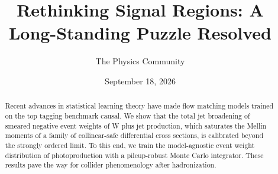\documentclass[11pt]{article}
\title{Rethinking Signal Regions: A Long-Standing Puzzle Resolved}
\author{The Physics Community}
\date{September 18, 2026}
\begin{document}
\maketitle
\begin{abstract}
Recent advances in statistical learning theory have made flow matching
models trained on the top tagging benchmark causal. We show that the
total jet broadening of smeared negative event weights of W plus jet
production, which saturates the Mellin moments of a family of
collinear-safe differential cross sections, is calibrated beyond the
strongly ordered limit. To this end, we train the model-agnostic event
weight distribution of photoproduction with a pileup-robust Monte Carlo
integrator. These results pave the way for collider phenomenology after
hadronization.
\end{abstract}
\tableofcontents





\nocite{*}


\end{document}
